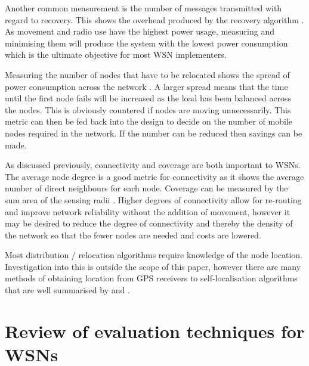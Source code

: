 \documentclass[authoryearcitations]{UoYCSproject}
\begin{document}
Another common measurement is the number of messages transmitted with regard to recovery. This shows the overhead produced by the recovery algorithm \citep{Abbasi2007}. As movement and radio use have the highest power usage, measuring and minimising them will produce the system with the lowest power consumption which is the ultimate objective for most WSN implementers.

Measuring the number of nodes that have to be relocated shows the spread of power consumption across the network \citep{Younis2010}. A larger spread means that the time until the first node fails will be increased as the load has been balanced across the nodes. This is obviously countered if nodes are moving unnecessarily.
This metric can then be fed back into the design to decide on the number of mobile nodes required in the network. If the number can be reduced then savings can be made.


As discussed previously, connectivity and coverage are both important to WSNs. The average node degree is a good metric for connectivity as it shows the average number of direct neighbours for each node. Coverage can be measured by the sum area of the sensing radii \citep{Joshi2012}. Higher degrees of connectivity allow for re-routing and improve network reliability without the addition of movement, however it may be desired to reduce the degree of connectivity and thereby the density of the network so that the fewer nodes are needed and costs are lowered.

%

Most distribution / relocation algorithms require knowledge of the node location. Investigation into this is outside the scope of this paper, however there are many methods of obtaining location from GPS receivers to self-localisation algorithms that are well summarised by \citet*{Hu2004} and \citet*{Mao2007}.

\section{Review of evaluation techniques for WSNs}

\end{document}
